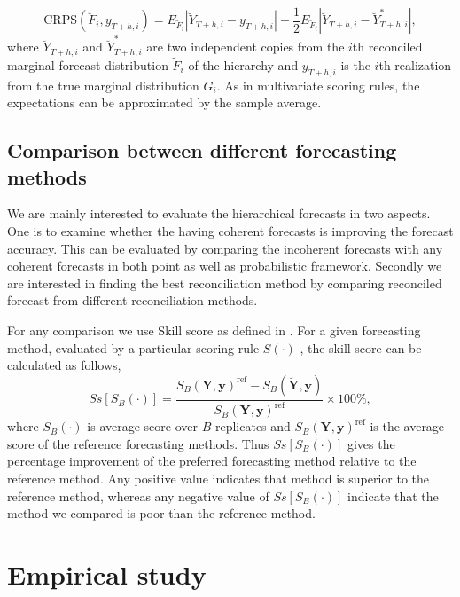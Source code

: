 \documentclass[graybox]{svmult}
\begin{document}
\begin{equation} \label{eq:24}
\text{CRPS}(\breve{F}_i,y_{T+h,i}) = E_{\breve{F}_i}|\breve{Y}_{T+h,i}-y_{T+h,i}| - \frac{1}{2}E_{\breve{F}_i}|\breve{Y}_{T+h,i}-\breve{Y}^*_{T+h,i}|,
\end{equation} 
where $\breve{Y}_{T+h,i}$ and $\breve{Y}^*_{T+h,i}$ are two independent copies from the $i$th reconciled marginal forecast distribution $\tilde{F}_i$ of the hierarchy and $y_{T+h,i}$ is the $i$th realization from the true marginal distribution $G_i$. As in multivariate scoring rules, the expectations can be approximated by the sample average.

\subsection{Comparison between different forecasting methods}

We are mainly interested to evaluate the hierarchical forecasts in two aspects. One is to examine whether the having coherent forecasts is improving the forecast accuracy. This can be evaluated by comparing the incoherent forecasts with any coherent forecasts in both point as well as probabilistic framework. Secondly we are interested in finding the best reconciliation method by comparing reconciled forecast from different reconciliation methods. 

For any comparison we use Skill score as defined in \citep{Gneiting2007}. For a given forecasting method, evaluated by a particular scoring rule $S(\cdot)$ , the skill score can be calculated as follows,
\begin{equation} \label{eq:25}
Ss[S_B(\cdot)] = \frac{S_B(\bm{Y},\bm{y})^{\text{ref}} - S_B(\breve{\bm{Y}},\bm{y})}{S_B(\bm{Y},\bm{y})^{\text{ref}}}\times 100\%,
\end{equation}
where $S_B(\cdot)$ is average score over $B$ replicates and $S_B(\bm{Y},\bm{y})^{\text{ref}}$ is the average score of the reference forecasting methods. Thus $Ss[S_B(\cdot)]$ gives the percentage improvement of the preferred forecasting method relative to the reference method. Any positive value indicates that method is superior to the reference method, whereas any negative value of $Ss[S_B(\cdot)]$ indicate that the method we compared is poor than the reference method. 

\section{Empirical study}
\end{document}
